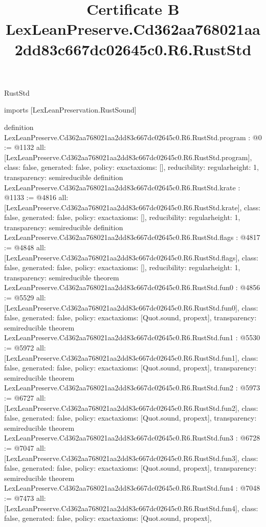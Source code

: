 \begin{lexlean}{RustStd}
\title{Certificate B LexLeanPreserve.Cd362aa768021aa2dd83c667dc02645c0.R6.RustStd}
\begin{coremodule}
imports [LexLeanPreservation.RustSound]

definition LexLeanPreserve.Cd362aa768021aa2dd83c667dc02645c0.R6.RustStd.program : @0 := @1132 {
  all: [LexLeanPreserve.Cd362aa768021aa2dd83c667dc02645c0.R6.RustStd.program],
  class: false,
  generated: false,
  policy: exact{axioms: []},
  reducibility: regular{height: 1},
  transparency: semireducible
}
definition LexLeanPreserve.Cd362aa768021aa2dd83c667dc02645c0.R6.RustStd.krate : @1133 := @4816 {
  all: [LexLeanPreserve.Cd362aa768021aa2dd83c667dc02645c0.R6.RustStd.krate],
  class: false,
  generated: false,
  policy: exact{axioms: []},
  reducibility: regular{height: 1},
  transparency: semireducible
}
definition LexLeanPreserve.Cd362aa768021aa2dd83c667dc02645c0.R6.RustStd.flags : @4817 := @4848 {
  all: [LexLeanPreserve.Cd362aa768021aa2dd83c667dc02645c0.R6.RustStd.flags],
  class: false,
  generated: false,
  policy: exact{axioms: []},
  reducibility: regular{height: 1},
  transparency: semireducible
}
theorem LexLeanPreserve.Cd362aa768021aa2dd83c667dc02645c0.R6.RustStd.fun0 : @4856 := @5529 {
  all: [LexLeanPreserve.Cd362aa768021aa2dd83c667dc02645c0.R6.RustStd.fun0],
  class: false,
  generated: false,
  policy: exact{axioms: [Quot.sound, propext]},
  transparency: semireducible
}
theorem LexLeanPreserve.Cd362aa768021aa2dd83c667dc02645c0.R6.RustStd.fun1 : @5530 := @5972 {
  all: [LexLeanPreserve.Cd362aa768021aa2dd83c667dc02645c0.R6.RustStd.fun1],
  class: false,
  generated: false,
  policy: exact{axioms: [Quot.sound, propext]},
  transparency: semireducible
}
theorem LexLeanPreserve.Cd362aa768021aa2dd83c667dc02645c0.R6.RustStd.fun2 : @5973 := @6727 {
  all: [LexLeanPreserve.Cd362aa768021aa2dd83c667dc02645c0.R6.RustStd.fun2],
  class: false,
  generated: false,
  policy: exact{axioms: [Quot.sound, propext]},
  transparency: semireducible
}
theorem LexLeanPreserve.Cd362aa768021aa2dd83c667dc02645c0.R6.RustStd.fun3 : @6728 := @7047 {
  all: [LexLeanPreserve.Cd362aa768021aa2dd83c667dc02645c0.R6.RustStd.fun3],
  class: false,
  generated: false,
  policy: exact{axioms: [Quot.sound, propext]},
  transparency: semireducible
}
theorem LexLeanPreserve.Cd362aa768021aa2dd83c667dc02645c0.R6.RustStd.fun4 : @7048 := @7473 {
  all: [LexLeanPreserve.Cd362aa768021aa2dd83c667dc02645c0.R6.RustStd.fun4],
  class: false,
  generated: false,
  policy: exact{axioms: [Quot.sound, propext]},
}
\end{coremodule}
\end{lexlean}
